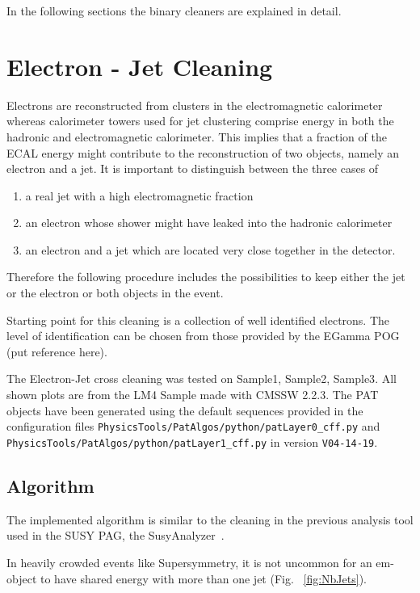 \documentclass{cmspaper}
\begin{document}
In the following sections the binary cleaners are explained in detail.


\section{Electron - Jet Cleaning}
\label{sec:ElecJet}
Electrons are reconstructed from clusters in the electromagnetic calorimeter
whereas calorimeter towers used for jet clustering comprise energy in both the hadronic
and electromagnetic calorimeter. This implies that a fraction of the ECAL energy
might contribute to the reconstruction of two objects, namely an electron and a
jet. It is important to distinguish between the three cases of
\begin{enumerate}
\item  a real jet with a high electromagnetic fraction
\item an electron whose shower might have leaked into the hadronic
    calorimeter
\item an electron and a jet which are located very close together in the
    detector.
\end{enumerate}
Therefore the following procedure includes the possibilities to keep either the
jet or the electron or both objects in the event.

Starting point for this cleaning is a collection of well identified electrons.
The level of identification can be chosen from those provided by the EGamma POG
{\color{red}(put reference here)}.

The Electron-Jet cross cleaning was tested on {\color{red}Sample1, Sample2, Sample3}. All shown plots are from the LM4 Sample made with CMSSW 2.2.3. The PAT objects have been
generated using the default sequences provided in the configuration files
\texttt{PhysicsTools/PatAlgos/python/patLayer0\_cff.py} and
\texttt{PhysicsTools/PatAlgos/python/patLayer1\_cff.py} in version
\texttt{V04-14-19}.
\\


\subsection{Algorithm}
The implemented algorithm is similar to the cleaning in the previous analysis
tool used in the SUSY PAG, the SusyAnalyzer~\cite{SusyAnalyzer}.

In heavily crowded events like Supersymmetry, it is not uncommon for an em-object to have shared energy with more than one jet (Fig. ~\ref{fig:NbJets}).
\end{document}
